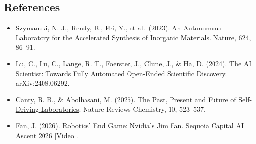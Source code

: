 \FloatBarrier
{}
\hypertarget{references-167}{%
\subsection{References}\label{references-167}}

\vspace{0.25em}
\begin{itemize}
\tightlist
\item
  Szymanski, N. J., Rendy, B., Fei, Y., et al.~(2023). \href{https://www.nature.com/articles/s41586-023-06734-w}{An Autonomous Laboratory for the Accelerated Synthesis of Inorganic Materials}. Nature, 624, 86--91.
\item
  Lu, C., Lu, C., Lange, R. T., Foerster, J., Clune, J., \& Ha, D. (2024). \href{https://arxiv.org/abs/2408.06292}{The AI Scientist: Towards Fully Automated Open-Ended Scientific Discovery}. arXiv:2408.06292.
\item
  Canty, R. B., \& Abolhasani, M. (2026). \href{https://www.nature.com/articles/s41570-026-00847-2}{The Past, Present and Future of Self-Driving Laboratories}. Nature Reviews Chemistry, 10, 523--537.
\item
  Fan, J. (2026). \href{https://www.youtube.com/watch?v=3Y8aq_ofEVs}{Robotics' End Game: Nvidia's Jim Fan}. Sequoia Capital AI Ascent 2026 {[}Video{]}.
\end{itemize}

\clearpage
